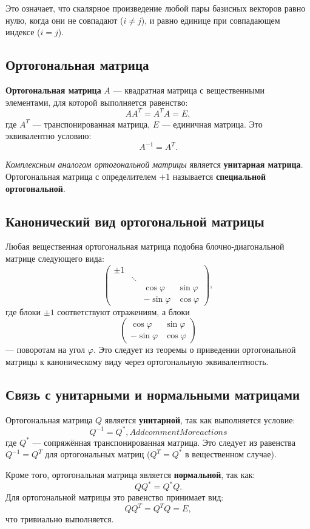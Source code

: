 \documentclass[12pt]{article}
\begin{document}
Это означает, что скалярное произведение любой пары базисных векторов равно нулю, когда они не совпадают ($i \neq j$), и равно единице при совпадающем индексе ($i = j$).

\subsection*{Ортогональная матрица}
\textbf{Ортогональная матрица} $A$ — квадратная матрица с вещественными элементами, для которой выполняется равенство:  
$$
AA^T = A^T A = E,
$$  
где $A^T$ — транспонированная матрица, $E$ — единичная матрица. Это эквивалентно условию:  
$$
A^{-1} = A^T.
$$  

\textit{Комплексным аналогом ортогональной матрицы} является \textbf{унитарная матрица}.  
Ортогональная матрица с определителем $+1$ называется \textbf{специальной ортогональной}.

\subsection*{Канонический вид ортогональной матрицы}
Любая вещественная ортогональная матрица подобна блочно-диагональной матрице следующего вида:
$$
\begin{pmatrix}
\pm 1 & & & \\
& \ddots & & \\
& & \cos \varphi & \sin \varphi \\
& & -\sin \varphi & \cos \varphi
\end{pmatrix},
$$
где блоки $\pm 1$ соответствуют отражениям, а блоки 
$$
\begin{pmatrix}
\cos \varphi & \sin \varphi \\
-\sin \varphi & \cos \varphi
\end{pmatrix}
$$ 
— поворотам на угол $\varphi$. Это следует из теоремы о приведении ортогональной матрицы к каноническому виду через ортогональную эквивалентность.

\subsection*{Связь с унитарными и нормальными матрицами}
Ортогональная матрица $Q$ является \textbf{унитарной}, так как выполняется условие:  
$$
Q^{-1} = Q^*,Add commentMore actions
$$  
где $Q^*$ — сопряжённая транспонированная матрица. Это следует из равенства $Q^{-1} = Q^T$ для ортогональных матриц ($Q^T = Q^*$ в вещественном случае).

Кроме того, ортогональная матрица является \textbf{нормальной}, так как:  
$$
QQ^* = Q^*Q.
$$  
Для ортогональной матрицы это равенство принимает вид:  
$$
QQ^T = Q^T Q = E,
$$  
что тривиально выполняется.
\end{document}
